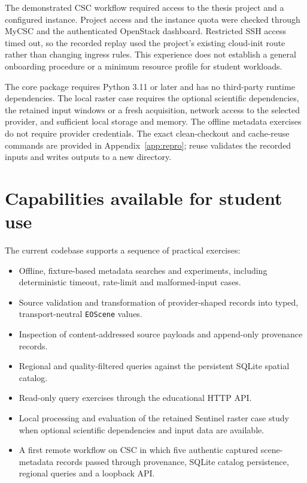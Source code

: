 The demonstrated CSC workflow required access to the thesis project and a configured
instance. Project access and the instance quota were checked through MyCSC and the
authenticated OpenStack dashboard. Restricted SSH access timed out, so the recorded
replay used the project's existing cloud-init route rather than changing ingress rules.
This experience does not establish a general onboarding procedure or a minimum resource
profile for student workloads.

The core package requires Python 3.11 or later and has no third-party runtime dependencies.
The local raster case requires the optional scientific dependencies, the retained input
windows or a fresh acquisition, network access to the selected provider, and sufficient
local storage and memory. The offline metadata exercises do not require provider
credentials. The exact clean-checkout and cache-reuse commands are provided in
Appendix~\ref{app:repro}; reuse validates the recorded inputs and writes outputs to a new
directory.

\section{Capabilities available for student use}

The current codebase supports a sequence of practical exercises:
\begin{itemize}
\item Offline, fixture-based metadata searches and experiments, including deterministic
  timeout, rate-limit and malformed-input cases.
\item Source validation and transformation of provider-shaped records into typed,
  transport-neutral \texttt{EOScene} values.
\item Inspection of content-addressed source payloads and append-only provenance records.
\item Regional and quality-filtered queries against the persistent SQLite spatial catalog.
\item Read-only query exercises through the educational HTTP API.
\item Local processing and evaluation of the retained Sentinel raster case study when
  optional scientific dependencies and input data are available.
\item A first remote workflow on CSC in which five authentic captured scene-metadata records
  passed through provenance, SQLite catalog persistence, regional queries and a loopback API.
\end{itemize}

